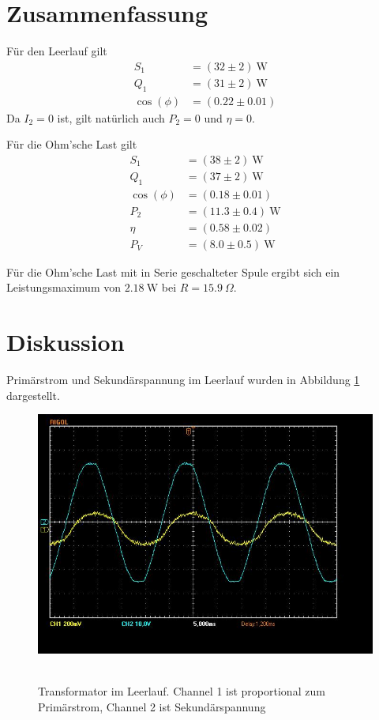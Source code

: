 \documentclass{article}
\newcommand{\W}{\text{W}}
\begin{document}
\section{Zusammenfassung}

Für den Leerlauf gilt
\begin{align*}
S_1 &= (32 \pm 2)~\W \\
Q_1 &= (31 \pm 2)~\W \\
\cos(\phi) &= (0.22 \pm 0.01)
\end{align*}
Da $I_2=0$ ist, gilt natürlich auch $P_2=0$ und $\eta = 0$.


Für die Ohm'sche Last gilt
\begin{align*}
S_1 &= (38 \pm 2)~\W \\
Q_1 &= (37 \pm 2)~\W \\
\cos(\phi) &= (0.18 \pm 0.01) \\
P_2 &= (11.3 \pm 0.4)~\W \\
\eta &= (0.58 \pm 0.02) \\
P_V &= (8.0 \pm 0.5)~\W
\end{align*}


Für die Ohm'sche Last mit in Serie geschalteter Spule ergibt sich ein Leistungsmaximum von $2.18~\W$ bei $R=15.9~\Omega$.

\section{Diskussion}


Primärstrom und Sekundärspannung im Leerlauf wurden in Abbildung \ref{fig:task1} dargestellt.


\begin{figure}[H]
\caption{Transformator im Leerlauf. Channel 1 ist proportional zum Primärstrom, Channel 2 ist Sekundärspannung}
\label{fig:task1}
{\centering
\includegraphics[scale=0.4]{task1.jpg}
~
}
\end{figure}
\end{document}
